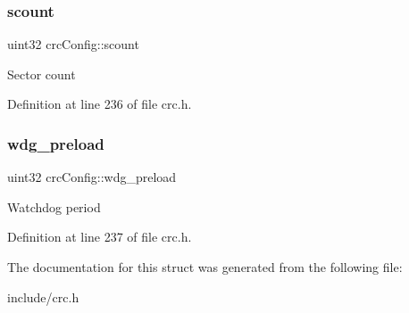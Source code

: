 \subsubsection{\texorpdfstring{scount}{scount}}
{\footnotesize\ttfamily uint32 crc\+Config\+::scount}

Sector count 

Definition at line 236 of file crc.\+h.

\mbox{\label{structcrcConfig_aec5b9938f600e872530c77b6746df64d}} 
\subsubsection{\texorpdfstring{wdg\+\_\+preload}{wdg\_preload}}
{\footnotesize\ttfamily uint32 crc\+Config\+::wdg\+\_\+preload}

Watchdog period 

Definition at line 237 of file crc.\+h.



The documentation for this struct was generated from the following file\+:\begin{DoxyCompactItemize}
\item 
include/crc.\+h\end{DoxyCompactItemize}

